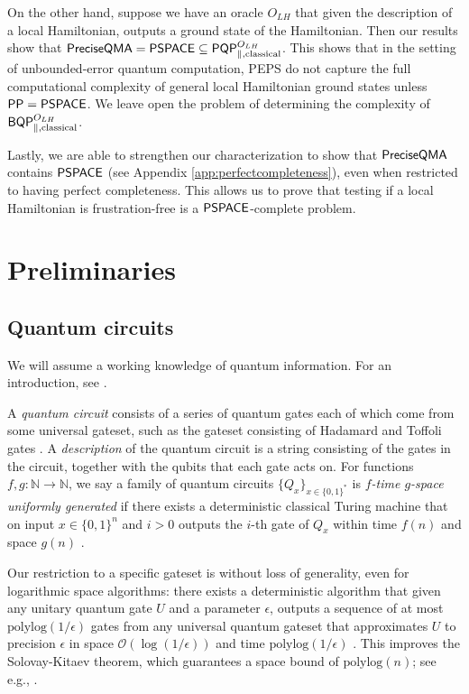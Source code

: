 \documentclass[11pt]{article}
\newtheorem{theorem}{Theorem}
\theoremstyle{definition}
\theoremstyle{remark}
\newcommand\PSPACE{{\sf{PSPACE}}}
\newcommand\PP{\sf{PP}}
\newcommand\BQP{{\sf{BQP}}}
\newcommand\PQP{{\sf{PQP}}}
\newcommand\QMAexp{{\sf{PreciseQMA}}}
\newcommand\bigoh{\mathcal{O}}
\newcommand{\polylog}{\textrm{polylog}}
\begin{document}
On the other hand, suppose we have an oracle $O_{LH}$ that given the description of a local Hamiltonian, outputs a ground state of the Hamiltonian. Then our results show that $\QMAexp = \PSPACE \subseteq \PQP^{O_{LH}}_{\parallel,\text{classical}}$. This shows that in the setting of unbounded-error quantum computation, PEPS do not capture the full computational complexity of general local Hamiltonian ground states unless $\PP=\PSPACE$. We leave open the problem of determining the complexity of $\BQP^{O_{LH}}_{\parallel,\text{classical}}$.

Lastly, we are able to strengthen our characterization to show that $\QMAexp$ contains $\PSPACE$ (see Appendix \ref{app:perfectcompleteness}), even when restricted to having perfect completeness.  This allows us to prove that testing if a local Hamiltonian is frustration-free is a $\PSPACE$-complete problem.  
 \section{Preliminaries}
\subsection{Quantum circuits}
We will assume a working knowledge of quantum information. For an introduction, see \cite{nc00}.

A \emph{quantum circuit} consists of a series of quantum gates each of which come from some universal gateset, such as the gateset consisting of Hadamard and Toffoli gates \cite{shi}.  A \emph{description} of the quantum circuit is a string consisting of the gates in the circuit, together with the qubits that each gate acts on.
 For functions $f,g:\mathbb{N}\rightarrow\mathbb{N}$, we say a family of quantum circuits $\{Q_x\}_{x\in\{0,1\}^*}$ is \emph{$f$-time $g$-space uniformly generated} if there exists a deterministic classical Turing machine that on input $x\in\{0,1\}^n$ and $i>0$ outputs the $i$-th gate of $Q_x$ within time $f(n)$ and space $g(n)$ \cite{nc00}.  
 
Our restriction to a specific gateset is without loss of generality, even for logarithmic space algorithms:  there exists a deterministic algorithm that given any unitary quantum gate $U$ and a parameter $\epsilon$, outputs a sequence of at most $\polylog({1/\epsilon})$ gates from any universal quantum gateset that approximates $U$ to precision $\epsilon$ in space $\bigoh({\log({1/\epsilon})})$ and time $\polylog({1/\epsilon})$ \cite{mw12}.  This improves the Solovay-Kitaev theorem, which guarantees a space bound of $\polylog(n)$; see e.g., \cite{nc00}.
\end{document}
